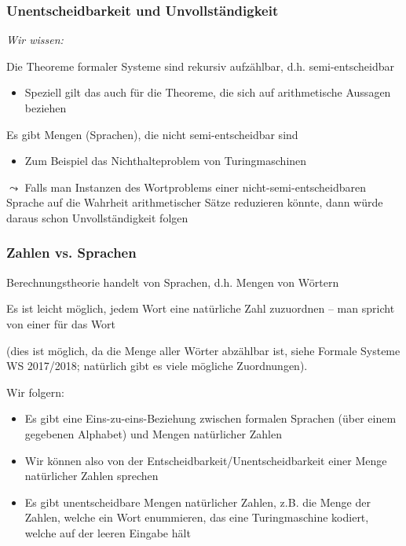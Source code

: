 \documentclass[aspectratio=1610,onlymath]{beamer}
\begin{document}
\begin{frame}\frametitle{Unentscheidbarkeit und Unvollständigkeit}

\emph{Wir wissen:}\medskip

Die Theoreme formaler Systeme sind rekursiv aufzählbar, d.h. semi-entscheidbar
\begin{itemize}
\item Speziell gilt das auch für die Theoreme, die sich auf arithmetische Aussagen beziehen
\end{itemize}\medskip

Es gibt Mengen (Sprachen), die nicht semi-entscheidbar sind
\begin{itemize}
\item Zum Beispiel das Nichthalteproblem von Turingmaschinen
\end{itemize}
\bigskip\pause

\alert{
$\leadsto$ Falls man Instanzen des Wortproblems einer nicht-semi-entscheidbaren Sprache auf die Wahrheit arithmetischer Sätze reduzieren könnte, dann würde daraus schon Unvollständigkeit folgen}

\end{frame}

\begin{frame}\frametitle{Zahlen vs. Sprachen}

Berechnungstheorie handelt von Sprachen, d.h. Mengen von Wörtern
\bigskip

Es ist leicht möglich, jedem Wort eine natürliche Zahl zuzuordnen -- man spricht von einer  für das Wort\\[0.5ex]
{\tiny(dies ist möglich, da die Menge aller Wörter abzählbar ist, siehe Formale Systeme WS 2017/2018; natürlich gibt es viele mögliche Zuordnungen).

}
\bigskip\pause

Wir folgern:
\begin{itemize}
\item Es gibt eine Eins-zu-eins-Beziehung zwischen formalen Sprachen (über einem gegebenen Alphabet) und Mengen natürlicher Zahlen
\item Wir können also von der Entscheidbarkeit/Unentscheidbarkeit einer Menge natürlicher Zahlen sprechen
\item Es gibt unentscheidbare Mengen natürlicher Zahlen, z.B. die Menge der Zahlen, welche ein Wort enummieren, das eine Turingmaschine kodiert, welche auf der leeren Eingabe hält
\end{itemize}

\end{frame}
\end{document}
